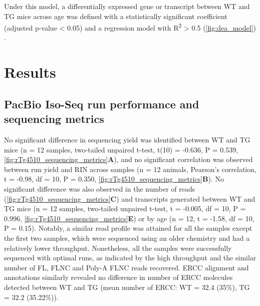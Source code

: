 Under this model, a differentially expressed gene or transcript between WT and TG mice across age was defined with a statistically significant coefficient (adjusted p-value < 0.05) and a regression model with R\textsuperscript{2} > 0.5  (\cref{fig:dea_model}) .


\clearpage 
\section{Results}
\subsection{PacBio Iso-Seq run performance and sequencing metrics}
No significant difference in sequencing yield was identified between WT and TG mice (n = 12 samples, two-tailed unpaired t-test, t(10) = -0.636, P = 0.539, \cref{fig:rTg4510_sequencing_metrics}\textbf{A}), and no significant correlation was observed between run yield and RIN across samples (n = 12 animals, Pearson's correlation, t = -0.98, df = 10, P = 0.350, \cref{fig:rTg4510_sequencing_metrics}\textbf{B}). No significant difference was also observed in the number of reads (\cref{fig:rTg4510_sequencing_metrics}\textbf{C}) and transcripts generated between WT and TG mice (n = 12 samples, two-tailed unpaired t-test, t = -0.005, df = 10, P = 0.996, \cref{fig:rTg4510_sequencing_metrics}\textbf{E}) or by age (n = 12, t = -1.58, df = 10, P = 0.15). Notably, a similar read profile was attained for all the samples except the first two samples, which were sequenced using an older chemistry and had a relatively lower throughput. Nonetheless, all the samples were successfully sequenced with optimal runs, as indicated by the high throughput and the similar number of FL, FLNC and Poly-A FLNC reads recovered. ERCC alignment and annotations similarly revealed no difference in number of ERCC molecules detected between WT and TG (mean number of ERCC: WT = 32.4 (35\%), TG = 32.2 (35.22\%)). 

